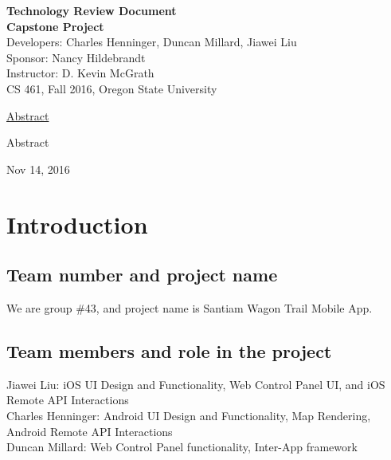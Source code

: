 \documentclass[letterpaper, 10pt,titlepage]{article}
\newcommand\tab[1][1cm]{\hspace*{#1}}
\begin{document}
\begin{titlepage}
\begin{center}
    \Huge
    \textbf{Technology Review Document}\\
    \textbf{Capstone Project}\\
    \vspace{1.0cm}
    \large
    Developers: Charles Henninger, Duncan Millard, Jiawei Liu\\
    Sponsor: Nancy Hildebrandt\\
    \vspace{1.5cm}
    \large
    Instructor: D. Kevin McGrath\\

    \large
    CS 461, Fall 2016, Oregon State University\\    

    \vspace{3.2cm}

    \large
    \underline{Abstract}\\
    \vspace{0.3cm}
    \end{center}
    \large

    \tab Abstract
    
    \vspace{0.8cm}
    \vfill
    
\begin{center}    
    Nov 14, 2016

\end{center}
\end{titlepage}


\tableofcontents
\newpage



\section{Introduction}
\subsection{Team number and project name}
We are group \#43, and project name is Santiam Wagon Trail Mobile App.


\subsection{Team members and role in the project}
Jiawei Liu: iOS UI Design and Functionality, Web Control Panel UI, and iOS Remote API Interactions \\
Charles Henninger: Android UI Design and Functionality, Map Rendering, Android Remote API Interactions\\
Duncan Millard: Web Control Panel functionality, Inter-App framework
\end{document}
